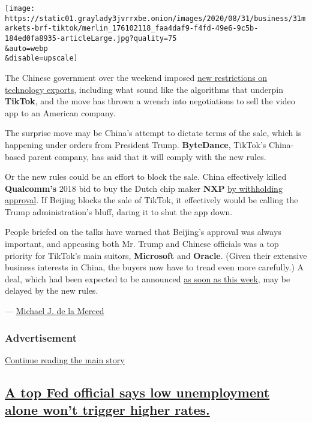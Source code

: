 \texttt{[image: https://static01.graylady3jvrrxbe.onion/images/2020/08/31/business/31markets-brf-tiktok/merlin\_176102118\_faa4daf9-f4fd-49e6-9c5b-184ed0fa8935-articleLarge.jpg?quality=75\\\&auto=webp\\\&disable=upscale]}

The Chinese government over the weekend imposed
\href{https://www.nytimes3xbfgragh.onion/2020/08/29/technology/china-tiktok-export-controls.html}{new
restrictions on technology exports}, including what sound like the
algorithms that underpin \textbf{TikTok}, and the move has thrown a
wrench into negotiations to sell the video app to an American company.

The surprise move may be China's attempt to dictate terms of the sale,
which is happening under orders from President Trump.
\textbf{ByteDance}, TikTok's China-based parent company, has said that
it will comply with the new rules.

Or the new rules could be an effort to block the sale. China effectively
killed \textbf{Qualcomm's} 2018 bid to buy the Dutch chip maker
\textbf{NXP}
\href{https://www.nytimes3xbfgragh.onion/2018/07/25/technology/qualcomm-nxp-china-deadline.html}{by
withholding approval}. If Beijing blocks the sale of TikTok, it
effectively would be calling the Trump administration's bluff, daring it
to shut the app down.

People briefed on the talks have warned that Beijing's approval was
always important, and appeasing both Mr. Trump and Chinese officials was
a top priority for TikTok's main suitors, \textbf{Microsoft} and
\textbf{Oracle}. (Given their extensive business interests in China, the
buyers now have to tread even more carefully.) A deal, which had been
expected to be announced
\href{https://www.cnbc.com/2020/08/31/tiktok-deal-to-sell-us-business-could-be-announced-as-soon-as-tomorrow.html}{as
soon as this week}, may be delayed by the new rules.

---
\href{https://www.nytimes3xbfgragh.onion/by/michael-j-de-la-merced}{Michael
J. de la Merced}

\hypertarget{advertisement-2}{%
\subsubsection{Advertisement}\label{advertisement-2}}

\protect\hyperlink{after-dfp-ad-mid1}{Continue reading the main story}

\hypertarget{a-top-fed-official-says-low-unemployment-alone-wont-trigger-higher-rates}{%
\subsection{\texorpdfstring{\protect\hyperlink{a-top-fed-official-says-low-unemployment-alone-wont-trigger-higher-rates}{A
top Fed official says low unemployment alone won't trigger higher
rates.}}{A top Fed official says low unemployment alone won't trigger higher rates.}}\label{a-top-fed-official-says-low-unemployment-alone-wont-trigger-higher-rates}}

